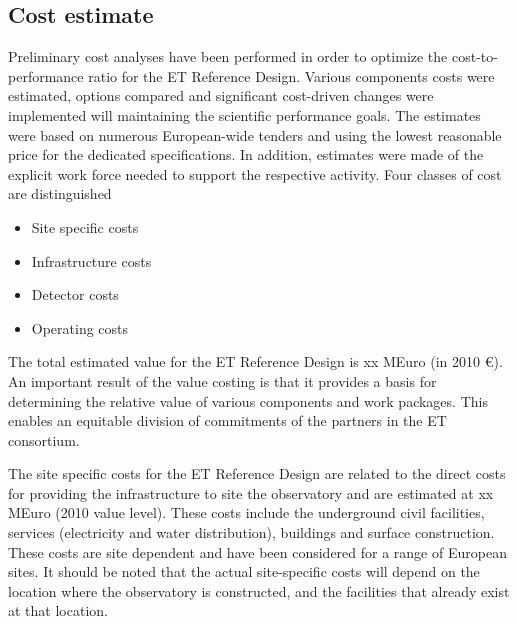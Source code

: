 %
%
%
%
%
%
%

\FloatBarrier
\subsection{Cost estimate}

Preliminary cost analyses have been performed in order to optimize the cost-to-performance ratio
for the ET Reference Design. Various components costs were estimated, options compared and
significant cost-driven changes were implemented will maintaining the scientific performance goals.
The estimates were based on numerous European-wide tenders and using the lowest
reasonable price for the dedicated specifications. In addition, estimates were made of the
explicit work force needed to support the respective activity. Four classes of cost are
distinguished
\begin{itemize}
	\item{} Site specific costs
	\item{} Infrastructure costs
	\item{} Detector costs
	\item{} Operating costs
\end{itemize}

The total estimated value for the ET Reference Design is xx MEuro (in 2010 \euro). 
An important result of the value costing is that it provides a basis for
determining the relative value of various components and work packages. This
enables an equitable division of commitments of the partners in the ET consortium.

The site specific costs for the ET Reference Design are related to the direct costs
for providing the infrastructure to site the observatory and are estimated at xx MEuro
(2010 value level). These costs include the underground civil facilities, services
(electricity and water distribution), buildings and surface construction. These costs
are site dependent and have been considered for a range of European sites. It
should be noted that the actual site-specific costs will depend on the location
where the observatory is constructed, and the facilities that already exist
at that location.

